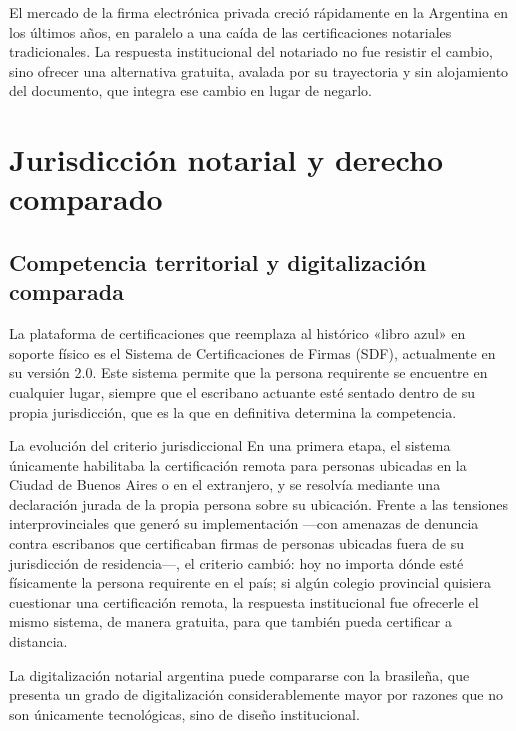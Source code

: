 \documentclass[12pt,oneside]{book}
\begin{document}
\begin{important}
El mercado de la firma electrónica privada creció rápidamente en la Argentina en los últimos años, en paralelo a una caída de las certificaciones notariales tradicionales. La respuesta institucional del notariado no fue resistir el cambio, sino ofrecer una alternativa gratuita, avalada por su trayectoria y sin alojamiento del documento, que integra ese cambio en lugar de negarlo.
\end{important}

\section{Jurisdicción notarial y derecho comparado}

\subsection{Competencia territorial y digitalización comparada}

La plataforma de certificaciones que reemplaza al histórico «libro azul» en soporte físico es el Sistema de Certificaciones de Firmas (SDF), actualmente en su versión 2.0. Este sistema permite que la persona requirente se encuentre en cualquier lugar, siempre que el escribano actuante esté sentado dentro de su propia jurisdicción, que es la que en definitiva determina la competencia.

\begin{example}{La evolución del criterio jurisdiccional}
En una primera etapa, el sistema únicamente habilitaba la certificación remota para personas ubicadas en la Ciudad de Buenos Aires o en el extranjero, y se resolvía mediante una declaración jurada de la propia persona sobre su ubicación. Frente a las tensiones interprovinciales que generó su implementación ---con amenazas de denuncia contra escribanos que certificaban firmas de personas ubicadas fuera de su jurisdicción de residencia---, el criterio cambió: hoy no importa dónde esté físicamente la persona requirente en el país; si algún colegio provincial quisiera cuestionar una certificación remota, la respuesta institucional fue ofrecerle el mismo sistema, de manera gratuita, para que también pueda certificar a distancia.
\end{example}

La digitalización notarial argentina puede compararse con la brasileña, que presenta un grado de digitalización considerablemente mayor por razones que no son únicamente tecnológicas, sino de diseño institucional.
\end{document}

